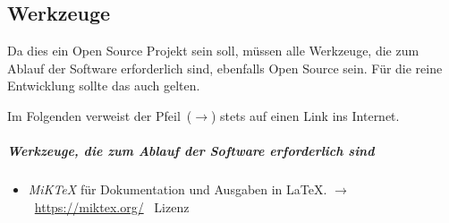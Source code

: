 \documentclass[english,ngerman,parskip=half,headsepline,footsepline]{scrreprt}
\newcounter{Enumi}
\begin{document}
	\appendix
	\chapter{\appendixname} %

	\thispagestyle{scrheadings}

	\section{Werkzeuge} %
	\label{sec:Werkzeuge}

	Da dies ein Open Source Projekt sein soll, müssen alle Werkzeuge, die zum Ablauf der Software erforderlich sind, ebenfalls Open Source sein. Für die reine Entwicklung sollte das auch gelten.

	Im Folgenden verweist der Pfeil~($\rightarrow$) stets auf einen Link ins Internet.

	\paragraph{Werkzeuge, die zum Ablauf der Software erforderlich sind}
	\begin{itemize}

		\item\label{Werkzeug:MiKTeX}\emph{MiK\TeX} für Dokumentation und Ausgaben in \LaTeX. $\rightarrow$~\url{https://miktex.org/} \textendash\ Lizenz~\cite{bib:MiKTeX}

		\setcounter{Enumi}{\value{enumi}}
	\end{itemize}
\end{document}
